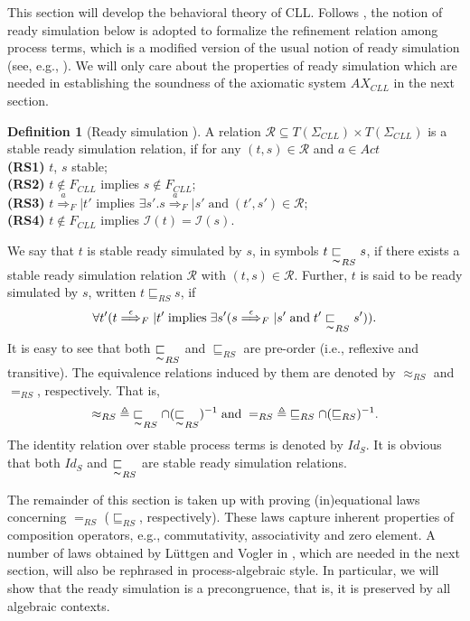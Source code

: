 \documentclass{elsarticle}
\theoremstyle{plain}
\theoremstyle{definition}
\newtheorem{mydefn}[theorem]{Definition}
\begin{document}
This section will develop the behavioral theory of CLL. Follows \cite{Luttgen10}, the notion of ready simulation below is adopted to formalize the refinement relation among process terms, which is a modified version of the usual notion of ready simulation (see, e.g., \cite{Glabbeek01}).
We will only care about the properties of ready simulation which are needed in establishing the soundness of the axiomatic system $AX_{CLL}$ in the next section.

\begin{mydefn}[Ready simulation \cite{Luttgen10}]\label{D:READYSIMULATION_TERMS}
A relation ${\mathcal R} \subseteq T(\Sigma_{CLL})\times T(\Sigma_{CLL})$ is a stable ready simulation relation, if for any $(t,s) \in {\mathcal R}$ and $a \in Act $\\
\textbf{(RS1)} $t$, $s$ stable;\\
\textbf{(RS2)} $t \notin F_{{CLL}}$ implies $s \notin F_{{CLL}}$;\\
\textbf{(RS3)} $t \stackrel{a}{\Longrightarrow}_F|t'$ implies $\exists s'.s \stackrel{a}{\Longrightarrow}_F|s'\; \textrm{and}\;(t',s') \in {\mathcal R}$;\\
\textbf{(RS4)} $t\notin F_{{CLL}}$ implies ${\mathcal I}(t)={\mathcal I}(s)$.
\end{mydefn}

 We say that $t$ is stable ready simulated by $s$, in symbols $t \underset{\thicksim}{\sqsubset}_{RS} s$, if there exists a stable ready simulation relation $\mathcal R$ with $(t,s) \in {\mathcal R}$.
 Further, $t$ is said to be ready simulated by $s$, written $t\sqsubseteq_{RS}s$, if \[\forall t'(t\stackrel{\epsilon}{\Longrightarrow}_F| t' \;\text{implies}\; \exists s'(s \stackrel{\epsilon}{\Longrightarrow}_F| s'\; \text{and}\;t' \underset{\thicksim}{\sqsubset}_{RS} s')).\]
 It is easy to see that both $\underset{\thicksim}{\sqsubset}_{RS}$ and $\sqsubseteq_{RS}$ are pre-order (i.e., reflexive and transitive). The equivalence relations induced by them are denoted by $\approx_{RS}$ and $=_{RS}$, respectively.
 That is, \[\approx_{RS} \;\triangleq\; \underset{\thicksim}{\sqsubset}_{RS} \cap (\underset{\thicksim}{\sqsubset}_{RS})^{-1}\; \text{and}\; =_{RS} \;\triangleq\; \sqsubseteq_{RS} \cap (\sqsubseteq_{RS})^{-1}.\] The identity relation over stable process terms is denoted by $Id_S$.
 It is obvious that both $Id_S$ and $\underset{\thicksim}{\sqsubset}_{RS}$ are stable ready simulation relations.


 The remainder of this section is taken up with proving (in)equational laws concerning $=_{RS}$ ($\sqsubseteq_{RS}$, respectively).
 These laws capture inherent properties of composition operators, e.g., commutativity, associativity and zero element.
 A number of laws obtained by L\"{u}ttgen and Vogler in \cite{Luttgen10}, which are needed in the next section, will also be rephrased in process-algebraic style.
 In particular, we will show that the ready simulation is a precongruence, that is, it is preserved by all algebraic contexts.
\end{document}
